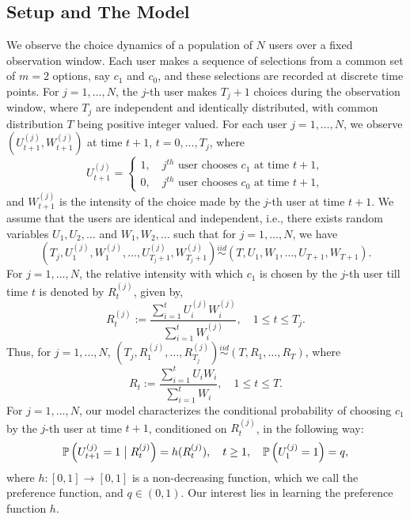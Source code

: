 \documentclass[12pt]{amsart}
\theoremstyle{plain}
\theoremstyle{remark}
\numberwithin{equation}{section}
\begin{document}
\subsection{Setup and The Model}\label{sec2.1} We observe the choice dynamics of a population of $N$ users over a fixed observation window. Each user makes a sequence of selections from a common set of $m = 2$ options, say $c_1$ and $c_0$, and these selections are recorded at discrete time points. For $j = 1, \ldots, N$, 
the ${j}$-th user makes ${T_j+1}$ choices during the observation window, where $T_j$ are independent and identically distributed, with common distribution $T$ being positive integer valued.  For each user $j = 1, \ldots, N$, we observe $\left(U^{(j)}_{t+1}, W^{(j)}_{t+1}\right)$ at time $t+1$, $t = 0, \ldots, T_j$, where 
\[
   U^{(j)}_{t+1} = \begin{cases} 1,  \quad j^{th} \text{ user chooses } c_1 \text{ at time } t+1, \\ 0, \quad j^{th} \text{ user chooses } c_0 \text{ at time } t+1,\end{cases}
\]
and $W^{(j)}_{t+1}$ is the intensity of the choice made by the $j$-th user at time $t+1$. We assume that the users are identical and independent, i.e., there exists random variables $U_{1}, U_2, \ldots $ and $W_{1}, W_2, \ldots $ such that for $j = 1, \ldots, N$, we have
\[\left(T_{j}, U^{(j)}_{1}, W^{(j)}_{1}, \ldots, U^{(j)}_{T_j+1}, W^{(j)}_{T_j+1}\right) \stackrel{iid}{\sim} \left(T, U_{1}, W_1, \ldots, U_{T+1}, W_{T+1}\right).\] For $j = 1, \ldots, N$, the relative intensity with which $c_1$ is chosen by the $j$-th user till time $t$ is denoted by $R^{(j)}_{t}$, given by,
\[
     R^{(j)}_{t} := \frac{\sum_{i=1}^{t} U^{(j)}_iW^{(j)}_i}{\sum_{i=1}^{t} W^{(j)}_i}, \quad 1 \leq t \leq T_j.
\]
Thus, for $j = 1, \ldots, N$, $\left(T_{j}, R^{(j)}_{1}, \ldots, R^{(j)}_{T_j}\right) \stackrel{iid}{\sim} \left(T, R_{1}, \ldots, R_{T}\right)$, where
\[
   R_{t} := \frac{\sum_{i=1}^{t} U_iW_i}{\sum_{i=1}^{t} W_i}, \quad 1 \leq t \leq T. 
\]
For $j = 1, \ldots, N$, our model characterizes the conditional probability of choosing $c_1$  by the $j$-th user at time $t + 1$, conditioned on $R^{(j)}_{t}$, in the following way: 
\[{\mathbb{P}\left(U^{(j)}_{t+1} = 1 \hspace{.1cm}\big|\hspace{.1cm} R^{(j)}_{t}\right)} = h(R^{(j)}_t), \quad t \geq 1, \quad \mathbb{P}\left(U^{(j)}_{1} = 1 \right) = q,\]
where $h:[0,1] \to [0,1]$ is a non-decreasing function, which we call the preference function, and $q \in (0,1)$. Our interest lies in learning the preference function $h$.
\end{document}

